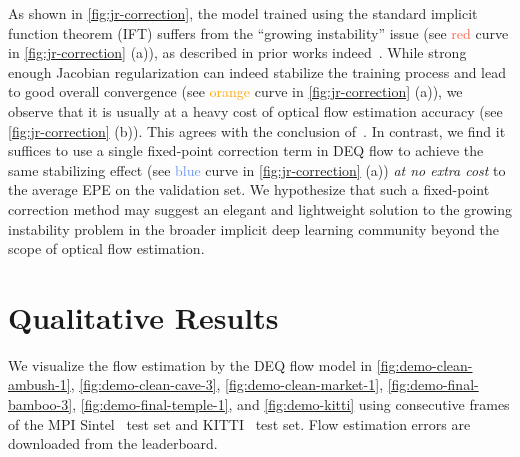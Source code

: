 \documentclass[10pt,twocolumn,letterpaper]{article}
\begin{document}
As shown in \cref{fig:jr-correction}, the model trained using the standard implicit function theorem (IFT) suffers from the ``growing instability'' issue (see \textcolor{tomato}{red} curve in \cref{fig:jr-correction} (a)), as described in prior works indeed~\citep{DEQ,DEQ_JR,chen2018neural,MON}. While strong enough Jacobian regularization can indeed stabilize the training process and lead to good overall convergence (see \textcolor{orange}{orange} curve in \cref{fig:jr-correction} (a)), we observe that it is usually at a heavy cost of optical flow estimation accuracy (see \cref{fig:jr-correction} (b)). This agrees with the conclusion of~\citet{DEQ_JR}. In contrast, we find it suffices to use a single fixed-point correction term in DEQ flow to achieve the same stabilizing effect (see \textcolor{cornflowerblue}{blue} curve in \cref{fig:jr-correction} (a)) \emph{at no extra cost} to the average EPE on the validation set. We hypothesize that such a fixed-point correction method may suggest an elegant and lightweight solution to the growing instability problem in the broader implicit deep learning community beyond the scope of optical flow estimation.

\section{Qualitative Results}

We visualize the flow estimation by the DEQ flow model in \cref{fig:demo-clean-ambush-1}, \cref{fig:demo-clean-cave-3}, \cref{fig:demo-clean-market-1}, \cref{fig:demo-final-bamboo-3}, \cref{fig:demo-final-temple-1}, and \cref{fig:demo-kitti} using consecutive frames of the MPI Sintel~\cite{sintel} test set and KITTI~\cite{kitti} test set. Flow estimation errors are downloaded from the leaderboard.
\end{document}
